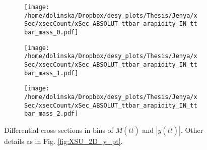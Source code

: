 \begin{figure}[p]
\centering
\begin{subfigure}
  \centering
  \texttt{[image: /home/dolinska/Dropbox/desy\_plots/Thesis/Jenya/xSec/xsecCount/xSec\_ABSOLUT\_ttbar\_arapidity\_IN\_ttbar\_mass\_0.pdf]}
\end{subfigure}
\begin{subfigure}
  \centering
  \texttt{[image: /home/dolinska/Dropbox/desy\_plots/Thesis/Jenya/xSec/xsecCount/xSec\_ABSOLUT\_ttbar\_arapidity\_IN\_ttbar\_mass\_1.pdf]}
\end{subfigure}
\begin{subfigure}
  \centering
  \texttt{[image: /home/dolinska/Dropbox/desy\_plots/Thesis/Jenya/xSec/xsecCount/xSec\_ABSOLUT\_ttbar\_arapidity\_IN\_ttbar\_mass\_2.pdf]}
\end{subfigure}
\caption{Differential cross sections in bins of $M(t\bar{t})$ and $|y(t\bar{t})|$. Other details as in Fig. \ref{fig:XSU_2D_y_pt}.}
\label{fig:XSU_2D_ytt_Mtt}
\end{figure}

